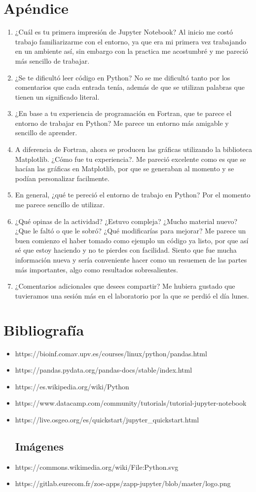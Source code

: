 \documentclass{article} %
\begin{document}
\section {Apéndice}
\begin{enumerate}
\item ¿Cuál es tu primera impresión de Jupyter Notebook?
Al inicio me costó trabajo familiarizarme con el entorno, ya que era mi primera vez trabajando en un ambiente así, sin embargo con la practica me acostumbré y me pareció más sencillo de trabajar.
\item ¿Se te dificultó leer código en Python?
No se me dificultó tanto por los comentarios que cada entrada tenía, además de que se utilizan palabras que tienen un significado literal.
\item ¿En base a tu experiencia de programación en Fortran, que te parece el entorno de trabajar en Python?
Me parece un entorno más amigable y sencillo de aprender.
\item A diferencia de Fortran, ahora se producen las gráficas utilizando la biblioteca Matplotlib. ¿Cómo fue tu experiencia?. 
Me pareció excelente como es que se hacían las gráficas en Matplotlib, por que se generaban al momento y se podían personalizar facilmente.
\item En general, ¿qué te pereció el entorno de trabajo en Python? 
Por el momento me parece sencillo de utilizar.
\item ¿Qué opinas de la actividad? ¿Estuvo compleja? ¿Mucho material nuevo? ¿Que le faltó o que le sobró? ¿Qué modificarías para mejorar? 
Me parece un buen comienzo el haber tomado como ejemplo un código ya listo, por que así sé que estoy haciendo y no te pierdes con facilidad. Siento que fue mucha información nueva y sería conveniente hacer como un resuemen de las partes más importantes, algo como resultados sobresalientes.
\item ¿Comentarios adicionales que desees compartir? 
Me hubiera gustado que tuvieramos una sesión más en el laboratorio por la que se perdió el día lunes.
\end{enumerate}

\section{Bibliografía}
\begin{itemize}
\item https://bioinf.comav.upv.es/courses/linux/python/pandas.html
\item https://pandas.pydata.org/pandas-docs/stable/index.html
\item https://es.wikipedia.org/wiki/Python
\item https://www.datacamp.com/community/tutorials/tutorial-jupyter-notebook
\item https://live.osgeo.org/es/quickstart/jupyter_quickstart.html
\subsection{Imágenes}
\item https://commons.wikimedia.org/wiki/File:Python.svg
\item https://gitlab.eurecom.fr/zoe-apps/zapp-jupyter/blob/master/logo.png
\end{itemize}
\end{document}
